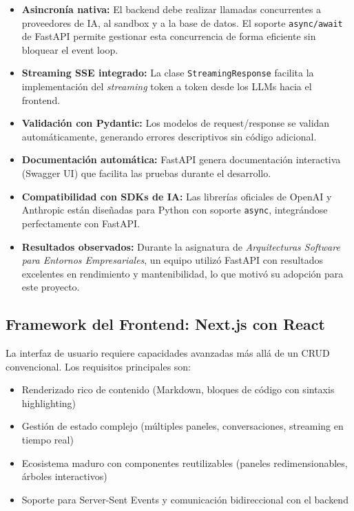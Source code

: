 \begin{itemize}
    \item \textbf{Asincronía nativa:} El backend debe realizar llamadas concurrentes a proveedores de IA, al sandbox y a la base de datos. El soporte \texttt{async/await} de FastAPI permite gestionar esta concurrencia de forma eficiente sin bloquear el event loop.
    \item \textbf{Streaming SSE integrado:} La clase \texttt{StreamingResponse} facilita la implementación del \textit{streaming} token a token desde los LLMs hacia el frontend.
    \item \textbf{Validación con Pydantic:} Los modelos de request/response se validan automáticamente, generando errores descriptivos sin código adicional.
    \item \textbf{Documentación automática:} FastAPI genera documentación interactiva (Swagger UI) que facilita las pruebas durante el desarrollo.
    \item \textbf{Compatibilidad con SDKs de IA:} Las librerías oficiales de OpenAI y Anthropic están diseñadas para Python con soporte \texttt{async}, integrándose perfectamente con FastAPI.
    \item \textbf{Resultados observados:} Durante la asignatura de \textit{Arquitecturas Software para Entornos Empresariales}, un equipo utilizó FastAPI con resultados excelentes en rendimiento y mantenibilidad, lo que motivó su adopción para este proyecto.
\end{itemize}

\subsection{Framework del Frontend: Next.js con React}

La interfaz de usuario requiere capacidades avanzadas más allá de un CRUD convencional. Los requisitos principales son:

\begin{itemize}
    \item Renderizado rico de contenido (Markdown, bloques de código con sintaxis highlighting)
    \item Gestión de estado complejo (múltiples paneles, conversaciones, streaming en tiempo real)
    \item Ecosistema maduro con componentes reutilizables (paneles redimensionables, árboles interactivos)
    \item Soporte para Server-Sent Events y comunicación bidireccional con el backend
\end{itemize}

